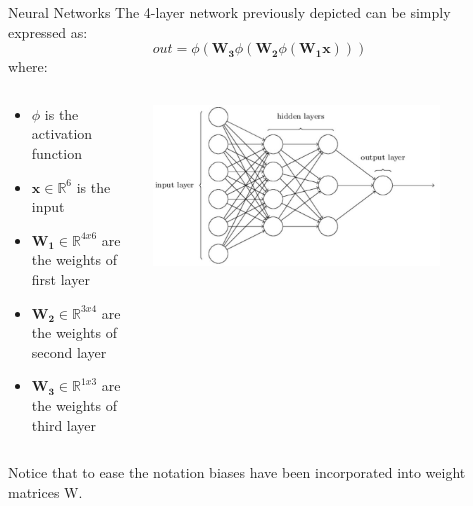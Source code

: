 \documentclass[aspectratio=169]{beamer}
\newcommand{\R}{\mathbb{R}}
\begin{document}
\begin{frame}{Neural Networks}
The 4-layer network previously depicted can be simply expressed as:
\begin{equation}\label{eq:feedforward}
out = \phi(\mathbf{W_3}\phi(\mathbf{W_2}\phi(\mathbf{W_1x})))
\end{equation}
where:
\begin{columns}
\begin{column}{0.6\textwidth}
\begin{itemize}
\item $\phi$ is the activation function
\item $\mathbf{x} \in \R^{6}$ is the input 
\item $\mathbf{W_1} \in \R^{4x6}$ are the weights of first layer
\item $\mathbf{W_2} \in \R^{3x4}$ are the weights of second layer
\item $\mathbf{W_3} \in \R^{1x3}$ are the weights of third layer
\end{itemize}
\end{column}
\begin{column}{0.4\textwidth}
\includegraphics[width=0.8\textwidth]{img/dnn/neural_network.jpg}   
\end{column}
\end{columns}
\vspace{0.1cm}
\small{Notice that to ease the notation biases have been incorporated into weight matrices W.}
\end{frame}

\end{document}
